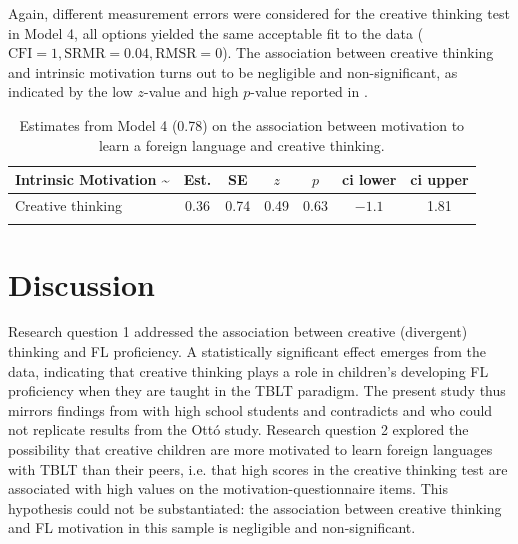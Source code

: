 \documentclass[output=paper]{langsci/langscibook}
\begin{document}
Again, different measurement errors were considered for the creative thinking test in Model 4, all options yielded the same acceptable fit to the data ($\text{CFI}=1, \text{SRMR}= 0.04, \text{RMSR}=0$). The association between creative thinking and intrinsic motivation turns out to be negligible and non-significant, as indicated by the low $z$-value and high $p$-value reported in .   

\begin{table}
\caption{\label{tab:06:3}Estimates from Model 4 (0.78) on the association between motivation to learn a foreign language and creative thinking.}
\begin{tabular}{l cccccc} 
\lsptoprule
{Intrinsic Motivation {\textasciitilde}} & {Est.} & {SE} & {$z$} & {$p$} & {ci lower} & {ci upper}\\\midrule
Creative thinking & 0.36 & 0.74 & 0.49 & 0.63 & $-1.1$ & 1.81\\
\lspbottomrule
\end{tabular}
\end{table}

\section{Discussion}

Research question 1 addressed the association between creative (divergent) thinking and FL proficiency. A statistically significant effect emerges from the data, indicating that creative thinking plays a role in children’s developing FL proficiency when they are taught in the TBLT paradigm. The present study thus mirrors findings from \citet{Otto1998} with high school students and contradicts \citet{Albert2006} and \citet{AlbertKormos2011} who could not replicate results from the Ottó study. Research question 2 explored the possibility that creative children are more motivated to learn foreign languages with TBLT than their peers, i.e. that high scores in the creative thinking test are associated with high values on the motivation-questionnaire items. This hypothesis could not be substantiated: the association between creative thinking and FL motivation in this sample is negligible and non-significant. 
\end{document}
